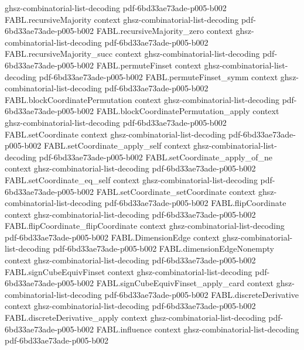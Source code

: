 \begin{theorem}
  {ghsz-combinatorial-list-decoding}
  {pdf-6bd33ae73ade-p005-b002}
\proofstep
  {FABL.recursiveMajority}
  {context}
  {ghsz-combinatorial-list-decoding}
  {pdf-6bd33ae73ade-p005-b002}
\proofstep
  {FABL.recursiveMajority_zero}
  {context}
  {ghsz-combinatorial-list-decoding}
  {pdf-6bd33ae73ade-p005-b002}
\proofstep
  {FABL.recursiveMajority_succ}
  {context}
  {ghsz-combinatorial-list-decoding}
  {pdf-6bd33ae73ade-p005-b002}
\proofstep
  {FABL.permuteFinset}
  {context}
  {ghsz-combinatorial-list-decoding}
  {pdf-6bd33ae73ade-p005-b002}
\proofstep
  {FABL.permuteFinset_symm}
  {context}
  {ghsz-combinatorial-list-decoding}
  {pdf-6bd33ae73ade-p005-b002}
\proofstep
  {FABL.blockCoordinatePermutation}
  {context}
  {ghsz-combinatorial-list-decoding}
  {pdf-6bd33ae73ade-p005-b002}
\proofstep
  {FABL.blockCoordinatePermutation_apply}
  {context}
  {ghsz-combinatorial-list-decoding}
  {pdf-6bd33ae73ade-p005-b002}
\proofstep
  {FABL.setCoordinate}
  {context}
  {ghsz-combinatorial-list-decoding}
  {pdf-6bd33ae73ade-p005-b002}
\proofstep
  {FABL.setCoordinate_apply_self}
  {context}
  {ghsz-combinatorial-list-decoding}
  {pdf-6bd33ae73ade-p005-b002}
\proofstep
  {FABL.setCoordinate_apply_of_ne}
  {context}
  {ghsz-combinatorial-list-decoding}
  {pdf-6bd33ae73ade-p005-b002}
\proofstep
  {FABL.setCoordinate_eq_self}
  {context}
  {ghsz-combinatorial-list-decoding}
  {pdf-6bd33ae73ade-p005-b002}
\proofstep
  {FABL.setCoordinate_setCoordinate}
  {context}
  {ghsz-combinatorial-list-decoding}
  {pdf-6bd33ae73ade-p005-b002}
\proofstep
  {FABL.flipCoordinate}
  {context}
  {ghsz-combinatorial-list-decoding}
  {pdf-6bd33ae73ade-p005-b002}
\proofstep
  {FABL.flipCoordinate_flipCoordinate}
  {context}
  {ghsz-combinatorial-list-decoding}
  {pdf-6bd33ae73ade-p005-b002}
\proofstep
  {FABL.DimensionEdge}
  {context}
  {ghsz-combinatorial-list-decoding}
  {pdf-6bd33ae73ade-p005-b002}
\proofstep
  {FABL.dimensionEdgeNonempty}
  {context}
  {ghsz-combinatorial-list-decoding}
  {pdf-6bd33ae73ade-p005-b002}
\proofstep
  {FABL.signCubeEquivFinset}
  {context}
  {ghsz-combinatorial-list-decoding}
  {pdf-6bd33ae73ade-p005-b002}
\proofstep
  {FABL.signCubeEquivFinset_apply_card}
  {context}
  {ghsz-combinatorial-list-decoding}
  {pdf-6bd33ae73ade-p005-b002}
\proofstep
  {FABL.discreteDerivative}
  {context}
  {ghsz-combinatorial-list-decoding}
  {pdf-6bd33ae73ade-p005-b002}
\proofstep
  {FABL.discreteDerivative_apply}
  {context}
  {ghsz-combinatorial-list-decoding}
  {pdf-6bd33ae73ade-p005-b002}
\proofstep
  {FABL.influence}
  {context}
  {ghsz-combinatorial-list-decoding}
  {pdf-6bd33ae73ade-p005-b002}

\end{theorem}
